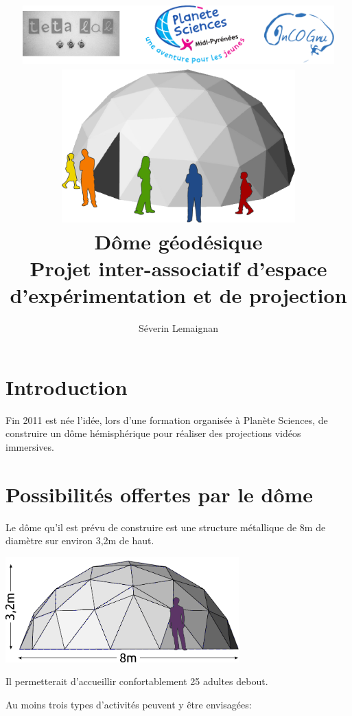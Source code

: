 \documentclass[a4paper,12pt]{report}
\title{
	\includegraphics[width=12cm]{logos.pdf}\\
	\vfill
	\includegraphics[width=9cm]{general.pdf}\\
	\vspace{3em}
	\LARGE{\textbf{Dôme géodésique}}\\[1cm]
	\large{Projet inter-associatif d'espace d'expérimentation et de projection}\\[1cm]
	\vfill
}
\author{
Séverin Lemaignan
}
\begin{document}

\maketitle

\tableofcontents


\chapter{Introduction}

Fin 2011 est née l'idée, lors d'une formation organisée à Planète Sciences, de construire un dôme hémisphérique pour réaliser des projections vidéos immersives.


\chapter{Possibilités offertes par le dôme}

Le dôme qu'il est prévu de construire est une structure métallique de 8m de diamètre sur environ 3,2m de haut.

\includegraphics[width=9cm]{dimensions.pdf}

Il permetterait d'accueillir confortablement 25 adultes debout.

Au moins trois types d'activités peuvent y être envisagées:
\end{document}
